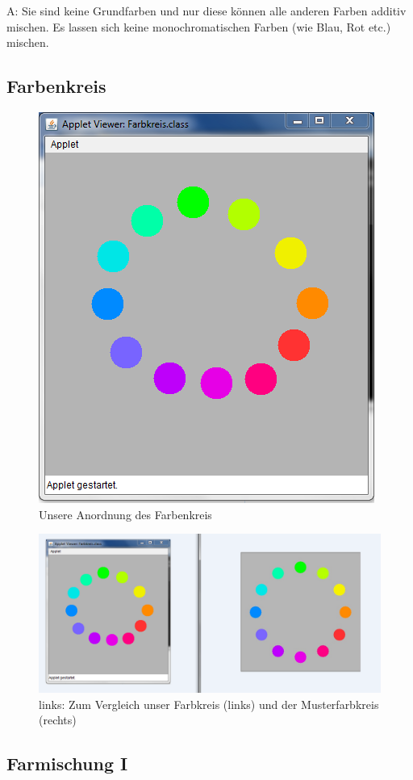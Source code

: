 \documentclass[a4paper]{article}
\begin{document}
\vspace{1.0\baselineskip}
\noindent A: Sie sind keine Grundfarben und nur diese können alle anderen Farben additiv mischen. Es lassen sich keine monochromatischen Farben (wie Blau, Rot etc.) mischen.

\newpage
\subsection{Farbenkreis}
\vspace{2.5\baselineskip}
\begin{figure}[H]
    \centering
    \includegraphics[width=0.5\columnwidth]{images/A2_Farbkreis.PNG}
    \caption{Unsere Anordnung des Farbenkreis}
    \label{fig:A2a}
\end{figure}
\vspace{2.5\baselineskip}
\begin{figure}[H]
    \centering
    \includegraphics[width=0.9\columnwidth]{images/A2_FarbkreisFertigVergleich.PNG}
    \caption{links: Zum Vergleich unser Farbkreis (links) und der Musterfarbkreis (rechts)}
    \label{fig:A2b}
\end{figure}

\newpage
\subsection{Farmischung I}
\end{document}
